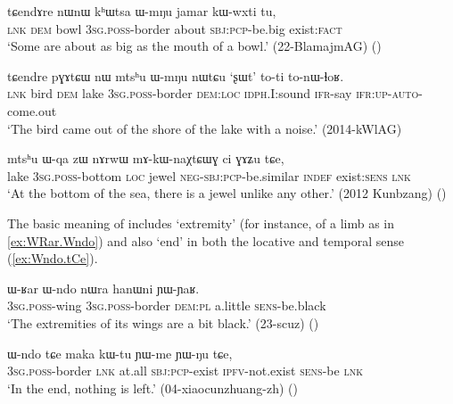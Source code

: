 \begin{exe}
\ex \label{ex:khWtsa.WmNu}
\gll  tɕendɤre nɯnɯ kʰɯtsa ɯ-mŋu jamar kɯ-wxti tu,\\
\textsc{lnk} \textsc{dem} bowl \textsc{3sg}.\textsc{poss}-border about \textsc{sbj}:\textsc{pcp}-be.big exist:\textsc{fact}\\
\glt  `Some are about as big as the mouth of a bowl.' (22-BlamajmAG)
()
\end{exe}

\begin{exe}
\ex \label{ex:mtshu.WmNu}
\gll   tɕendre pɣɤtɕɯ nɯ mtsʰu ɯ-mŋu nɯtɕu `ʂɯt' to-ti to-nɯ-ɬoʁ.  \\
\textsc{lnk} bird \textsc{dem} lake \textsc{3sg}.\textsc{poss}-border \textsc{dem}:\textsc{loc} \textsc{idph}.I:sound \textsc{ifr}-say \textsc{ifr}:\textsc{up}-\textsc{auto}-come.out \\
\glt  `The bird came out of the shore of the lake with a noise.' (2014-kWlAG)
\end{exe}

\begin{exe}
\ex \label{ex:mtshu.Wqa}
\gll  mtsʰu ɯ-qa zɯ nɤrwɯ mɤ-kɯ-naχtɕɯɣ ci ɣɤʑu tɕe, \\
lake \textsc{3sg}.\textsc{poss}-bottom \textsc{loc} jewel \textsc{neg}-\textsc{sbj}:\textsc{pcp}-be.similar \textsc{indef} exist:\textsc{sens} \textsc{lnk} \\
\glt `At the bottom of the sea, there is a jewel unlike any other.' (2012 Kunbzang)
()
\end{exe}

The basic meaning of  includes `extremity' (for instance, of a limb as in \ref{ex:WRar.Wndo}) and also `end' in both the locative and temporal sense (\ref{ex:Wndo.tCe}).

\begin{exe}
\ex \label{ex:WRar.Wndo}
\gll ɯ-ʁar ɯ-ndo nɯra hanɯni ɲɯ-ɲaʁ. \\ 
\textsc{3sg}.\textsc{poss}-wing \textsc{3sg}.\textsc{poss}-border \textsc{dem}:\textsc{pl} a.little \textsc{sens}-be.black \\
\glt  `The extremities of its wings are a bit black.' (23-scuz)
()
\end{exe}

\begin{exe}
\ex \label{ex:Wndo.tCe}
\gll  ɯ-ndo tɕe maka kɯ-tu ɲɯ-me ɲɯ-ŋu tɕe,  \\
\textsc{3sg}.\textsc{poss}-border \textsc{lnk} at.all \textsc{sbj}:\textsc{pcp}-exist \textsc{ipfv}-not.exist \textsc{sens}-be \textsc{lnk} \\
\glt `In the end, nothing is left.' (04-xiaocunzhuang-zh)
()
\end{exe}

